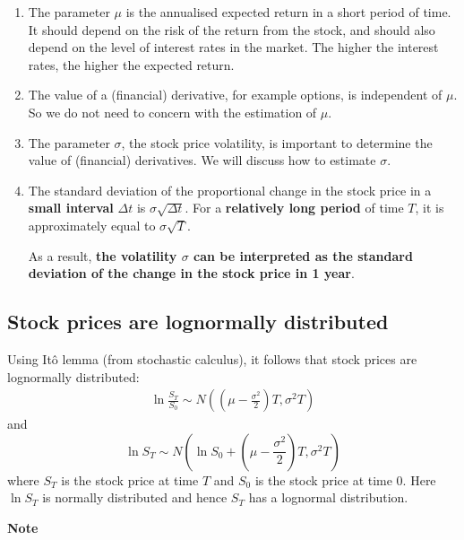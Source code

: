 \documentclass[landscape, 20pt]{extreport}
\theoremstyle{definition}
\theoremstyle{definition}
\theoremstyle{definition}
\theoremstyle{definition}
\theoremstyle{remark}
\begin{document}
\begin{enumerate}
\def\labelenumi{\arabic{enumi}.}
\item
  The parameter \(\mu\) is the annualised expected return in a short
  period of time. It should depend on the risk of the return from the
  stock, and should also depend on the level of interest rates in the
  market. The higher the interest rates, the higher the expected
  return.
\item
  The value of a (financial) derivative, for example options, is
  independent of \(\mu\). So we do not need to concern with the
  estimation of \(\mu\).
\item
  The parameter \(\sigma\), the stock price volatility, is important to
  determine the value of (financial) derivatives. We will discuss how
  to estimate \(\sigma\).
\item
  The standard deviation of the proportional change in the stock price
  in a \textbf{small interval} \(\Delta t\) is \(\sigma \sqrt{\Delta t}\). For
  a \textbf{relatively long period} of time \(T\), it is approximately equal
  to \(\sigma \sqrt{T}\).

  As a result, \textbf{the volatility \(\sigma\) can be interpreted as the
  standard deviation of the change in the stock price in 1 year}.
\end{enumerate}

\hypertarget{stock-prices-are-lognormally-distributed}{%
\subsection*{Stock prices are lognormally distributed}\label{stock-prices-are-lognormally-distributed}}

Using Itô lemma (from stochastic calculus), it follows that stock prices
are lognormally distributed: \[\begin{aligned}
 \label{lognormal}
 \ln \frac{S_T}{S_0} \sim N\left((\mu - \frac{\sigma^2}{2})T,\sigma^2 T\right)
 \end{aligned}\] and
\[\ln S_T \sim N\left(\ln S_0 +  (\mu - \frac{\sigma^2}{2})T,\sigma^2 T\right)\]
where \(S_T\) is the stock price at time \(T\) and \(S_0\) is the stock price
at time 0. Here \(\ln S_T\) is normally distributed and hence \(S_T\) has a
lognormal distribution.

\textbf{Note}
\end{document}
